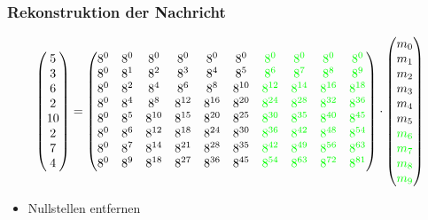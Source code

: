 \documentclass[11pt,aspectratio=169]{beamer}
\begin{document}
	\begin{frame}
		\frametitle{Rekonstruktion der Nachricht}
		
		\[
		\begin{pmatrix}
			5 \\ 3 \\ 6 \\ 2 \\ 10 \\ 2 \\ 7 \\ 4 \\
		\end{pmatrix}
		=
		\begin{pmatrix}
			8^0&    8^0&    8^0&    8^0&    8^0&    8^0&    \textcolor{green}{8^0}&    \textcolor{green}{8^0}&    \textcolor{green}{8^0}&    \textcolor{green}{8^0}\\
			8^0&	8^1&	8^2&	8^3&	8^4&	8^5&	\textcolor{green}{8^6}&	   \textcolor{green}{8^7}&    \textcolor{green}{8^8}&    \textcolor{green}{8^9}\\
			8^0&	8^2&	8^4&	8^6&	8^8& 8^{10}& \textcolor{green}{8^{12}}& \textcolor{green}{8^{14}}& \textcolor{green}{8^{16}}& \textcolor{green}{8^{18}}\\
			8^0&	8^4&	8^8& 8^{12}& 8^{16}& 8^{20}& \textcolor{green}{8^{24}}& \textcolor{green}{8^{28}}& \textcolor{green}{8^{32}}& \textcolor{green}{8^{36}}\\
			8^0&	8^5& 8^{10}& 8^{15}& 8^{20}& 8^{25}& \textcolor{green}{8^{30}}& \textcolor{green}{8^{35}}& \textcolor{green}{8^{40}}& \textcolor{green}{8^{45}}\\
			8^0&	8^6& 8^{12}& 8^{18}& 8^{24}& 8^{30}& \textcolor{green}{8^{36}}& \textcolor{green}{8^{42}}& \textcolor{green}{8^{48}}& \textcolor{green}{8^{54}}\\
			8^0&	8^7& 8^{14}& 8^{21}& 8^{28}& 8^{35}& \textcolor{green}{8^{42}}& \textcolor{green}{8^{49}}& \textcolor{green}{8^{56}}& \textcolor{green}{8^{63}}\\
			8^0&	8^9& 8^{18}& 8^{27}& 8^{36}& 8^{45}& \textcolor{green}{8^{54}}& \textcolor{green}{8^{63}}& \textcolor{green}{8^{72}}& \textcolor{green}{8^{81}}\\
		\end{pmatrix}
		\cdot
		\begin{pmatrix}
			m_0 \\ m_1 \\ m_2 \\ m_3 \\ m_4 \\ m_5 \\ \textcolor{green}{m_6} \\ \textcolor{green}{m_7} \\ \textcolor{green}{m_8} \\ \textcolor{green}{m_9} \\
		\end{pmatrix}
		\]
		
		\begin{itemize}
			\item Nullstellen entfernen
		\end{itemize}
	
	\end{frame}
\end{document}
